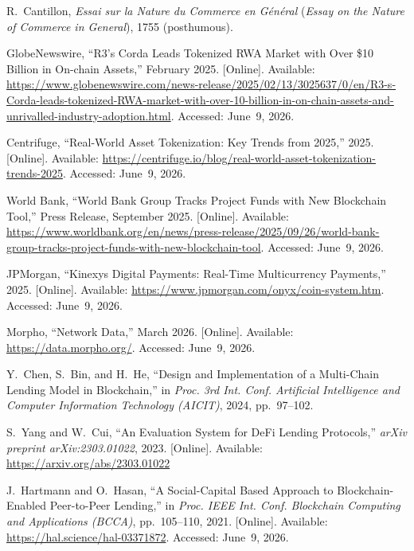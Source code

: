 \documentclass[12pt, a4paper]{report}
\begin{document}
{\begin{enumerate}[label={[\arabic*]}]
\item R.~Cantillon, \textit{Essai sur la Nature du Commerce en G\'en\'eral} (\textit{Essay on the Nature of Commerce in General}), 1755 (posthumous).

\item GlobeNewswire, ``R3's Corda Leads Tokenized RWA Market with Over \$10 Billion in On-chain Assets,'' February 2025. [Online]. Available: \url{https://www.globenewswire.com/news-release/2025/02/13/3025637/0/en/R3-s-Corda-leads-tokenized-RWA-market-with-over-10-billion-in-on-chain-assets-and-unrivalled-industry-adoption.html}. Accessed: June~9, 2026.

\item Centrifuge, ``Real-World Asset Tokenization: Key Trends from 2025,'' 2025. [Online]. Available: \url{https://centrifuge.io/blog/real-world-asset-tokenization-trends-2025}. Accessed: June~9, 2026.

\item World Bank, ``World Bank Group Tracks Project Funds with New Blockchain Tool,'' Press Release, September 2025. [Online]. Available: \url{https://www.worldbank.org/en/news/press-release/2025/09/26/world-bank-group-tracks-project-funds-with-new-blockchain-tool}. Accessed: June~9, 2026.

\item JPMorgan, ``Kinexys Digital Payments: Real-Time Multicurrency Payments,'' 2025. [Online]. Available: \url{https://www.jpmorgan.com/onyx/coin-system.htm}. Accessed: June~9, 2026.

\item Morpho, ``Network Data,'' March 2026. [Online]. Available: \url{https://data.morpho.org/}. Accessed: June~9, 2026.

\item Y.~Chen, S.~Bin, and H.~He, ``Design and Implementation of a Multi-Chain Lending Model in Blockchain,'' in \textit{Proc. 3rd Int. Conf. Artificial Intelligence and Computer Information Technology (AICIT)}, 2024, pp.~97--102.

\item S.~Yang and W.~Cui, ``An Evaluation System for DeFi Lending Protocols,'' \textit{arXiv preprint arXiv:2303.01022}, 2023. [Online]. Available: \url{https://arxiv.org/abs/2303.01022}

\item J.~Hartmann and O.~Hasan, ``A Social-Capital Based Approach to Blockchain-Enabled Peer-to-Peer Lending,'' in \textit{Proc. IEEE Int. Conf. Blockchain Computing and Applications (BCCA)}, pp.~105--110, 2021. [Online]. Available: \url{https://hal.science/hal-03371872}. Accessed: June~9, 2026.


\end{enumerate}}
\end{document}
